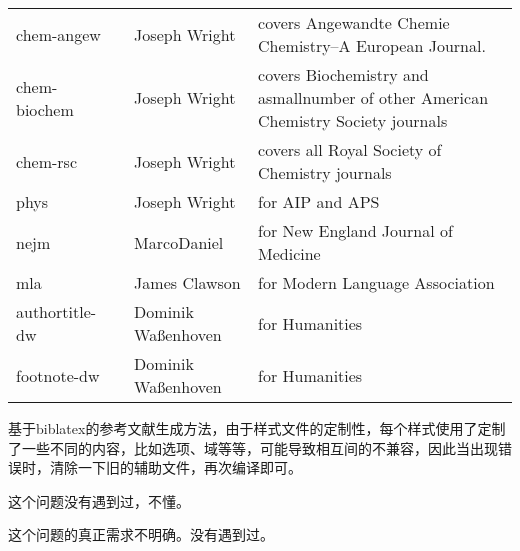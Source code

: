 \begin{table}[!htb]
\begin{tabular}{p{2cm}p{3cm}p{3cm}p{6cm}}
    chem-angew &       & Joseph Wright & covers Angewandte Chemie Chemistry–A European Journal. \\
    chem-biochem &       & Joseph Wright & covers Biochemistry and asmallnumber of other American Chemistry Society journals \\
    chem-rsc &       & Joseph Wright & covers all Royal Society of Chemistry journals \\
    phys  &       & Joseph Wright & for AIP and APS \\
    nejm  &       & MarcoDaniel & for New England Journal of Medicine \\
    mla   &       & James Clawson & for Modern Language Association \\
    authortitle-dw &       & Dominik Waßenhoven & for Humanities \\
    footnote-dw &       & Dominik Waßenhoven & for Humanities \\ \hline
    \end{tabular}
\end{table}%



基于biblatex的参考文献生成方法，由于样式文件的定制性，每个样式使用了定制了一些不同的内容，比如选项、域等等，可能导致相互间的不兼容，因此当出现错误时，清除一下旧的辅助文件，再次编译即可。



这个问题没有遇到过，不懂。





这个问题的真正需求不明确。没有遇到过。




